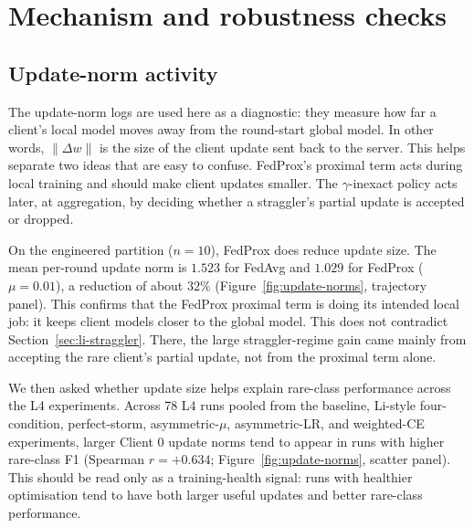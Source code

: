 \documentclass[11pt,a4paper]{report}
\begin{document}


\section{Mechanism and robustness checks}
\label{sec:mechanism-robustness}

\subsection{Update-norm activity}

The update-norm logs are used here as a diagnostic: they measure how far a
client's local model moves away from the round-start global model. In other
words, $\lVert \Delta w \rVert$ is the size of the client update sent back to
the server. This helps separate two ideas that are easy to confuse. FedProx's
proximal term acts during local training and should make client updates
smaller. The $\gamma$-inexact policy acts later, at aggregation, by deciding
whether a straggler's partial update is accepted or dropped.

On the engineered partition ($n=10$), FedProx does reduce update size. The
mean per-round update norm is $1.523$ for FedAvg and $1.029$ for FedProx
($\mu=0.01$), a reduction of about $32\%$
(Figure~\ref{fig:update-norms}, trajectory panel). This confirms that the
FedProx proximal term is doing its intended local job: it keeps client models
closer to the global model. This does not contradict
Section~\ref{sec:li-straggler}.
There, the large straggler-regime gain came mainly from accepting the rare
client's partial update, not from the proximal term alone.

We then asked whether update size helps explain rare-class performance across
the L4 experiments. Across 78 L4 runs pooled from the baseline, Li-style
four-condition, perfect-storm, asymmetric-$\mu$, asymmetric-LR, and
weighted-CE experiments, larger Client 0 update norms tend to appear in runs
with higher rare-class F1 (Spearman $r=+0.634$;
Figure~\ref{fig:update-norms}, scatter panel). This should be read only as a
training-health signal: runs with healthier optimisation tend to have both
larger useful updates and better rare-class performance.
\end{document}
